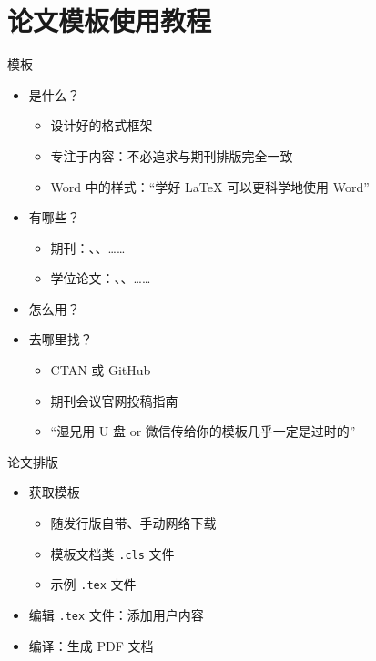 
\section{论文模板使用教程}

\begin{frame}[fragile]{模板}
\begin{itemize}
  \item<+-> 是什么？
    \begin{itemize}
      \item 设计好的格式框架
      \item 专注于内容：\alert{不必追求与期刊排版完全一致}
      \item Word 中的样式：``学好 \LaTeX{} 可以更科学地使用 Word''
    \end{itemize}

  \item<+-> 有哪些？
    \begin{itemize}
      \item 期刊：、、……
      \item 学位论文：、、……
    \end{itemize}

  \item<+-> 怎么用？

  \item<+-> 去哪里找？
    \begin{itemize}
      \item CTAN  或 GitHub 
      \item 期刊会议官网投稿指南
      \item ``湿兄用 U 盘 or 微信传给你的模板几乎一定是过时的''
    \end{itemize}
\end{itemize}
\end{frame}

\begin{frame}{论文排版}
  \begin{itemize}
    \item 获取模板
      \begin{itemize}
        \item 随发行版自带、手动网络下载
        \item 模板文档类 \texttt{.cls} 文件
        \item 示例 \texttt{.tex} 文件
      \end{itemize}
    \item 编辑 \texttt{.tex} 文件：添加用户内容
    \item 编译：生成 PDF 文档
  \end{itemize}
\end{frame}

